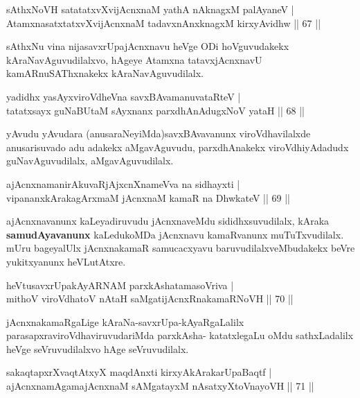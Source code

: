 \begin{shl}
sAthxNoVH satatatxvXvijAcnxnaM yathA nAknagxM palAyaneV |\\
AtamxnasatxtatxvXvijAcnxnaM tadavxnAnxknagxM kirxyAvidhw \hfill || 67 ||
\end{shl}

\begin{artha}
sAthxNu vina nijasavxrUpajAcnxnavu heVge ODi hoVguvudakekx kAraNavAguvudilalxvo, hAgeye Atamxna tatavxjAcnxnavU kamARnuSAThxnakekx kAraNavAguvudilalx.
\end{artha}

\begin{shl}
yadidhx yasAyxviroVdheVna savxBAvamanuvataRteV |\\
tatatxsayx guNaBUtaM sAyxnanx parxdhAnAdugxNoV yataH \hfill || 68 ||
\end{shl}

\begin{artha}
yAvudu yAvudara (anusaraNeyiMda)savxBAvavanunx viroVdhavilalxde anusarisuvado adu adakekx aMgavAguvudu, parxdhAnakekx viroVdhiyAdadudx guNavAguvudilalx, aMgavAguvudilalx.
\end{artha}

\begin{shl}
ajAcnxnamanirAkuvaRjAjxcnXnameVva na sidhayxti |\\
vipananxkArakagArxmaM jAcnxnaM kamaR na DhwkateV \hfill || 69 ||
\end{shl}

\begin{artha}
ajAcnxnavanunx kaLeyadiruvudu jAcnxnaveMdu sididhxsuvudilalx, kAraka \textbf{samudAya\-vanunx} kaLedukoMDa jAcnxnavu kamaRvanunx muTuTxvudilalx. mUru bageyalUlx jAcnxnakamaR samucacxyavu baruvudilalxveMbudakekx beVre yukitxyanunx heVLutAtxre.
\end{artha}

\begin{shl}
heVtusavxrUpakAyARNAM parxkAshatamasoVriva |\\
mithoV viroVdhatoV nAtaH saMgatijAcnxRnakamaRNoVH \hfill || 70 ||
\end{shl}

\begin{artha}
jAcnxnakamaRgaLige kAraNa-savxrUpa-kAyaRgaLalilx parasapxra\break viroVdhaviruvudariMda parxkAsha- katatxlegaLu oMdu sathxLadalilx heVge seVruvudilalxvo hAge seVruvudilalx.
\end{artha}

\begin{shl}
sakaqtapxrXvaqtAtxyX maqdAnxti kirxyAkArakarUpaBaqtf |\\
ajAcnxnamAgamajAcnxnaM sAMgatayxM nAsatxyXtoV\s nayoVH \hfill || 71 ||
\end{shl}

